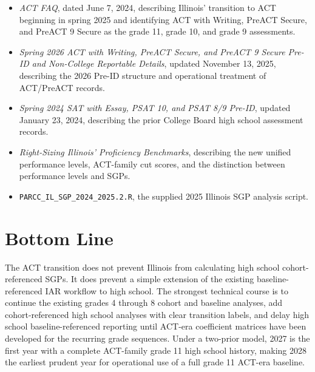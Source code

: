 \documentclass[11pt]{article}
\begin{document}
\begin{itemize}
\item \textit{ACT FAQ}, dated June 7, 2024, describing Illinois' transition to ACT beginning in spring 2025 and identifying ACT with Writing, PreACT Secure, and PreACT 9 Secure as the grade 11, grade 10, and grade 9 assessments.
\item \textit{Spring 2026 ACT with Writing, PreACT Secure, and PreACT 9 Secure Pre-ID and Non-College Reportable Details}, updated November 13, 2025, describing the 2026 Pre-ID structure and operational treatment of ACT/PreACT records.
\item \textit{Spring 2024 SAT with Essay, PSAT 10, and PSAT 8/9 Pre-ID}, updated January 23, 2024, describing the prior College Board high school assessment records.
\item \textit{Right-Sizing Illinois' Proficiency Benchmarks}, describing the new unified performance levels, ACT-family cut scores, and the distinction between performance levels and SGPs.
\item \texttt{PARCC\_IL\_SGP\_2024\_2025.2.R}, the supplied 2025 Illinois SGP analysis script.
\end{itemize}

\section{Bottom Line}

The ACT transition does not prevent Illinois from calculating high school cohort-referenced SGPs. It does prevent a simple extension of the existing baseline-referenced IAR workflow to high school. The strongest technical course is to continue the existing grades 4 through 8 cohort and baseline analyses, add cohort-referenced high school analyses with clear transition labels, and delay high school baseline-referenced reporting until ACT-era coefficient matrices have been developed for the recurring grade sequences. Under a two-prior model, 2027 is the first year with a complete ACT-family grade 11 high school history, making 2028 the earliest prudent year for operational use of a full grade 11 ACT-era baseline.
\end{document}
